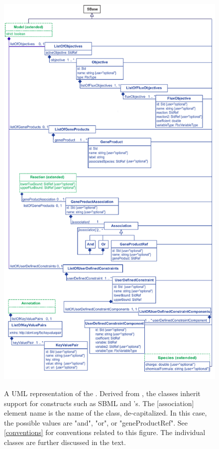 \begin{figure}[ht!]
  \centering
  \includegraphics[height=0.85\textheight]{images/fbc_uml_v3.pdf}\\
  \caption{A UML representation of the \FBCPackage. Derived from \SBase, the
	\FBC classes inherit support for constructs such as SBML \Notes and
	\Annotation's. The [association] element name is the name of the class, de-capitalized.  In this case, the possible values are "and", "or", or "geneProductRef". See \ref{conventions} for conventions related to this figure.
	The individual classes are further discussed in the text.}
  \label{fig:fbc_uml}
\end{figure}




